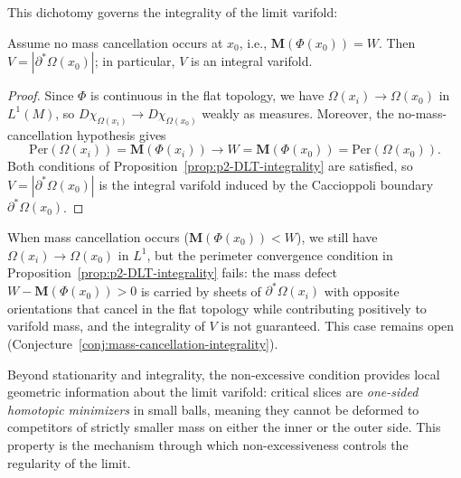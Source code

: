 This dichotomy governs the integrality of the limit varifold:

\begin{theorem}\label{prop:limit-dichotomy}\label{thm:integrality-mult-one}
Assume no mass cancellation occurs at $x_0$, i.e., $\mathbf{M}(\Phi(x_0)) = W$. Then $V = |\partial^*\Omega(x_0)|$; in particular, $V$ is an integral varifold.
\end{theorem}

\begin{proof}
Since $\Phi$ is continuous in the flat topology, we have $\Omega(x_i) \to \Omega(x_0)$ in $L^1(M)$, so $D\chi_{\Omega(x_i)} \to D\chi_{\Omega(x_0)}$ weakly as measures. Moreover, the no-mass-cancellation hypothesis gives
\[
\mathrm{Per}(\Omega(x_i)) = \mathbf{M}(\Phi(x_i)) \to W = \mathbf{M}(\Phi(x_0)) = \mathrm{Per}(\Omega(x_0)).
\]
Both conditions of Proposition~\ref{prop:p2-DLT-integrality} are satisfied, so $V = |\partial^*\Omega(x_0)|$ is the integral varifold induced by the Caccioppoli boundary $\partial^*\Omega(x_0)$.
\end{proof}

When mass cancellation occurs ($\mathbf{M}(\Phi(x_0)) < W$), we still have $\Omega(x_i) \to \Omega(x_0)$ in $L^1$, but the perimeter convergence condition in Proposition~\ref{prop:p2-DLT-integrality} fails: the mass defect $W - \mathbf{M}(\Phi(x_0)) > 0$ is carried by sheets of $\partial^*\Omega(x_i)$ with opposite orientations that cancel in the flat topology while contributing positively to varifold mass, and the integrality of $V$ is not guaranteed. This case remains open (Conjecture~\ref{conj:mass-cancellation-integrality}).

Beyond stationarity and integrality, the non-excessive condition provides local geometric information about the limit varifold: critical slices are \emph{one-sided homotopic minimizers} in small balls, meaning they cannot be deformed to competitors of strictly smaller mass on either the inner or the outer side. This property is the mechanism through which non-excessiveness controls the regularity of the limit.


